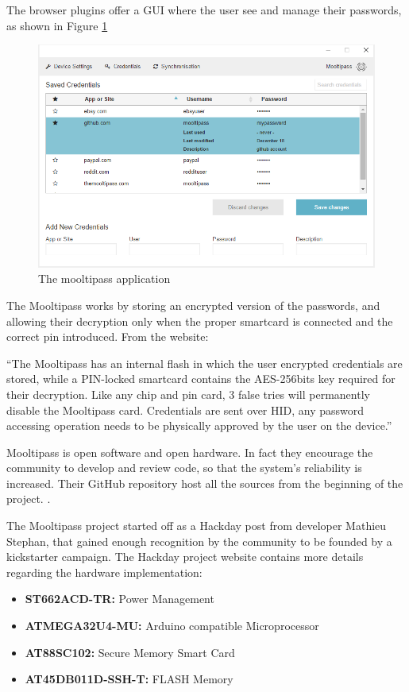 The browser plugins offer a GUI where the user see and manage their passwords, as shown in Figure \ref{fig:mpapp}

\begin{figure}[htb]
  \centering
  \captionsetup{justification=centering}
  \centerline{\includegraphics[width=0.9\columnwidth]{chapters/figures/related/mpapp.png}}
  \caption{The mooltipass application}
  \label{fig:mpapp}
\end{figure}

The Mooltipass works by storing an encrypted version of the passwords, and allowing their decryption only when the proper smartcard is connected and the correct pin introduced. From the website:

``The Mooltipass has an internal flash in which the user encrypted credentials are stored, while a PIN-locked smartcard contains the AES-256bits key required for their decryption. Like any chip and pin card, 3 false tries will permanently disable the Mooltipass card. Credentials are sent over HID, any password accessing operation needs to be physically approved by the user on the device.''

Mooltipass is open software and open hardware. In fact they encourage the community to develop and review code, so that the system's reliability is increased. Their GitHub repository host all the sources from the beginning of the project. \cite{mpgit}.

The Mooltipass project started off as a Hackday post from developer Mathieu Stephan, that gained enough recognition by the community to be founded by a kickstarter campaign. The Hackday project website \cite{mphack} contains more details regarding the hardware implementation:

\begin{itemize}
\setlength\itemsep{-3pt}

\item \textbf{ST662ACD-TR:} Power Management
\item \textbf{ATMEGA32U4-MU:} Arduino compatible Microprocessor
\item \textbf{AT88SC102:} Secure Memory Smart Card
\item \textbf{AT45DB011D-SSH-T:} FLASH Memory
\end{itemize}

